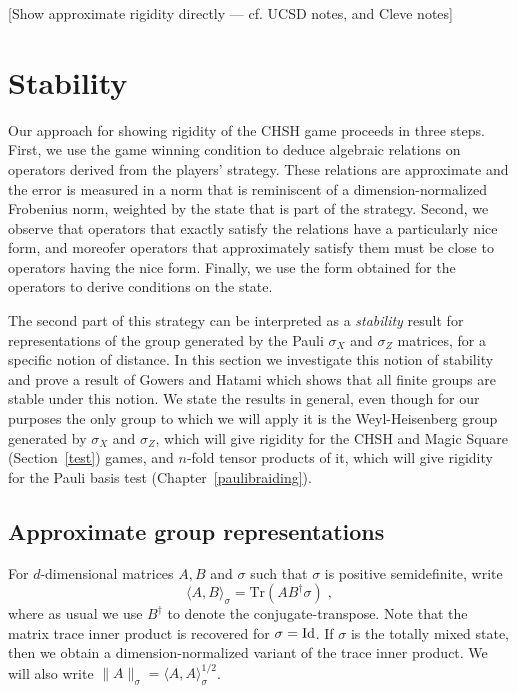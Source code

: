 [Show approximate rigidity directly --- cf. UCSD notes, and Cleve notes]

\section{Stability}
\label{section-stability}

Our approach for showing rigidity of the CHSH game proceeds in three steps. First, we use the game winning condition to deduce algebraic relations on operators derived from the players' strategy. These relations are approximate and the error is measured in a norm that is reminiscent of a dimension-normalized Frobenius norm, weighted by the state that is part of the strategy. Second, we observe that operators that exactly satisfy the relations have a particularly nice form, and moreofer operators that approximately satisfy them must be close to operators having the nice form. Finally, we use the form obtained for the operators to derive conditions on the state. 

The second part of this strategy can be interpreted as a \emph{stability} result for representations of the group generated by the Pauli $\sigma_X$ and $\sigma_Z$ matrices, for a specific notion of distance. In this section we investigate this notion of stability and prove a result of Gowers and Hatami which shows that all finite groups are stable under this notion. We state the results in general, even though for our purposes the only group to which we will apply it is the Weyl-Heisenberg group generated by $\sigma_X$ and $\sigma_Z$, which will give rigidity for the CHSH and Magic Square (Section~\ref{test}) games, and $n$-fold tensor products of it, which will give rigidity for the Pauli basis test (Chapter~\ref{paulibraiding}).


\subsection{Approximate group representations}
\label{section-approxrep}

For $d$-dimensional matrices  $A,B$ and $\sigma$ such that $\sigma$ is positive semidefinite, write 
$$\langle A,B\rangle_\sigma = \mathrm{Tr}(AB^\dagger \sigma)\;,$$
where as usual we use $B^\dagger$ to denote the conjugate-transpose. Note that the matrix trace inner product is recovered for $\sigma = \mathop{\rm Id}\nolimits$. If $\sigma$ is the totally mixed state, then we obtain a dimension-normalized variant of the trace inner product. We will also write $\|A\|_\sigma = \langle A,A\rangle_\sigma^{1/2}$. 


